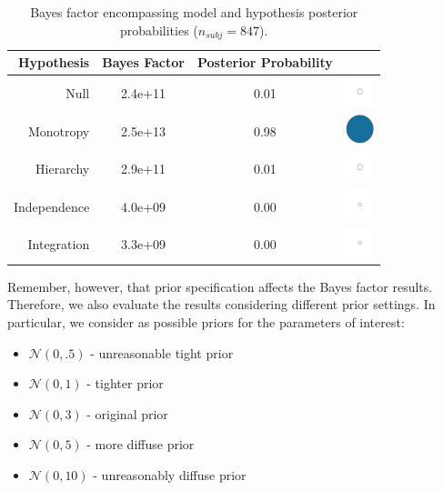 \documentclass[
]{book}
\providecommand{\tightlist}{%
  \setlength{\itemsep}{0pt}\setlength{\parskip}{0pt}}
\begin{document}
\begin{table}[!h]

\caption{\label{tab:table-bf-results-ext}Bayes factor encompassing model and hypothesis posterior probabilities  ($n_{subj} = 847$).}
\centering
\begin{tabular}[t]{rcc>{\centering\arraybackslash}m{1cm}}
\toprule
\textbf{Hypothesis} & \textbf{Bayes Factor} & \textbf{Posterior Probability} & \textbf{ }\\
\midrule
Null & 2.4e+11 & 0.01 & \includegraphics[width=0.33in, height=0.33in]{images/ball_BF_ext_null.png}\\
Monotropy & 2.5e+13 & 0.98 & \includegraphics[width=0.33in, height=0.33in]{images/ball_BF_ext_monotropy.png}\\
Hierarchy & 2.9e+11 & 0.01 & \includegraphics[width=0.33in, height=0.33in]{images/ball_BF_ext_hierarchy.png}\\
Independence & 4.0e+09 & 0.00 & \includegraphics[width=0.33in, height=0.33in]{images/ball_BF_ext_independence.png}\\
Integration & 3.3e+09 & 0.00 & \includegraphics[width=0.33in, height=0.33in]{images/ball_BF_ext_integration.png}\\
\bottomrule
\end{tabular}
\end{table}

Remember, however, that prior specification affects the Bayes factor results. Therefore, we also evaluate the results considering different prior settings. In particular, we consider as possible priors for the parameters of interest:

\begin{itemize}
\tightlist
\item
  \(\mathcal{N}(0,.5)\) - unreasonable tight prior
\item
  \(\mathcal{N}(0,1)\) - tighter prior
\item
  \(\mathcal{N}(0,3)\) - original prior
\item
  \(\mathcal{N}(0,5)\) - more diffuse prior
\item
  \(\mathcal{N}(0,10)\) - unreasonably diffuse prior
\end{itemize}
\end{document}
